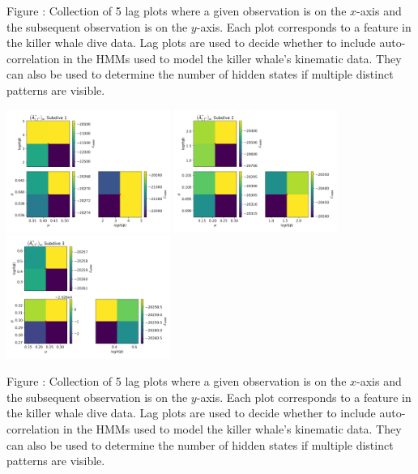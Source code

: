 \documentclass{article}
\begin{document}
        \noindent Figure : Collection of 5 lag plots where a given observation is on the $x$-axis and the subsequent observation is on the $y$-axis. Each plot corresponds to a feature in the killer whale dive data. Lag plots are used to decide whether to include auto-correlation in the HMMs used to model the killer whale's kinematic data. They can also be used to determine the number of hidden states if multiple distinct patterns are visible. 
        \addtocounter{fignum}{1}
        
        \begin{center}
        \includegraphics[width=2.1in]{../Plots/2019/20190902-182840-CATs_OB_1_0_267_CarHHMM2_fine-theta-likelihood-Ax-0.png}
        \includegraphics[width=2.1in]{../Plots/2019/20190902-182840-CATs_OB_1_0_267_CarHHMM2_fine-theta-likelihood-Ax-1.png}
        \includegraphics[width=2.1in]{../Plots/2019/20190902-182840-CATs_OB_1_0_267_CarHHMM2_fine-theta-likelihood-Ax-2.png}
        \end{center}
        
        \noindent Figure : Collection of 5 lag plots where a given observation is on the $x$-axis and the subsequent observation is on the $y$-axis. Each plot corresponds to a feature in the killer whale dive data. Lag plots are used to decide whether to include auto-correlation in the HMMs used to model the killer whale's kinematic data. They can also be used to determine the number of hidden states if multiple distinct patterns are visible. 
        \addtocounter{fignum}{1}
        
\end{document}
